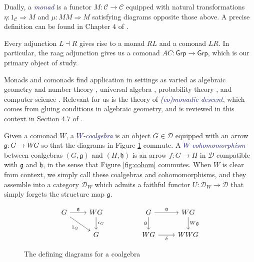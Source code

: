 \documentclass[12pt]{article}
\theoremstyle{definition}
\theoremstyle{theorem}
\newcommand*{\catFont}[1]{\mathsf{#1}}
\newcommand*{\catVarFont}[1]{\mathcal{#1}}
\newcommand{\Grp}{\catFont{Grp}}
\newcommand{\catC}{\catVarFont{C}}
\newcommand{\catD}{\catVarFont{D}}
\newcommand*{\important}[1]{\textcolor{MidnightBlue}{\emph{#1}}}
\begin{document}
Dually, a \important{monad} is a functor $M : \catC \to \catC$ equipped with 
natural transformations $\eta : 1_\catC \Rightarrow M$ and 
$\mu : MM \Rightarrow M$ satisfying diagrams opposite those above. A precise
definition can be found in Chapter $4$ of \cite{borceuxCategoriesStructures1994}.

Every adjunction $L \dashv R$ gives rise to a monad $RL$ and a comonad 
$LR$. In particular, the raag adjunction gives us a comonad 
$AC : \Grp \to \Grp$, which is our primary object of study.

Monads and comonads find application in settings as varied as algebraic 
geometry and number theory
\cite{grothendieckTechniqueDescenteTheoremes1958, 
borceuxCategoriesStructures1994,
borceuxMonadicApproachGalois2010},
universal algebra 
\cite{borceuxCategoriesStructures1994,
adamekAlgebraicTheoriesCategorical2011,
bojanczykRecognisableLanguagesMonads2015,
awodeyCoalgebraicDualBirkhoff2000,
hylandCategoryTheoreticUnderstanding2007},
probability theory 
\cite{giryCategoricalApproachProbability1982,
culbertsonCategoricalFoundationBayesian2014,
leinsterCODENSITYULTRAFILTERMONAD2013},
and computer science 
\cite{moggiNotionsComputationMonads1991,
depaivaDialecticaComonads2021,
ghaniAlgebrasCoalgebrasMonads2001,
ruttenUniversalCoalgebraTheory2000}.
Relevant for us is the theory of \important{(co)monadic descent}, 
which comes from gluing conditions in algebraic geometry, 
and is reviewed in this context in Section $4.7$ of 
\cite{borceuxCategoriesStructures1994}.

Given a comonad $W$, a \important{$W$-coalgebra} is an object
$G \in \catD$ equipped with an arrow $\mathfrak{g} : G \to WG$ so that the
diagrams in Figure \ref{fig:coalg} commute. A \important{$W$-cohomomorphism}
between coalgebras $(G,\mathfrak{g})$ and $(H,\mathfrak{h})$ is an arrow $f : G \to H$
in $\mathcal{D}$ compatible with $\mathfrak{g}$ and $\mathfrak{h}$, in the sense that 
Figure \ref{fig:cohom} commutes. When $W$ is clear from context, we simply call these
coalgebras and cohomomorphisms, and they assemble into a category $\catD_W$
which admits a faithful functor $U : \catD_W \to \catD$ that 
simply forgets the structure map $\mathfrak{g}$.

\begin{figure}
    \[
        \begin{tikzcd}
        G & WG && G & WG \\
        & G && WG & WWG
        \arrow["\mathfrak{g}", from=1-1, to=1-2]
        \arrow["{\epsilon_G}", from=1-2, to=2-2]
        \arrow["{1_G}"', from=1-1, to=2-2]
        \arrow["\mathfrak{g}"', from=1-4, to=2-4]
        \arrow["\mathfrak{g}", from=1-4, to=1-5]
        \arrow["\delta"', from=2-4, to=2-5]
        \arrow["W\mathfrak{g}", from=1-5, to=2-5]
        \end{tikzcd}
    \]
    \caption{The defining diagrams for a coalgebra}
    \label{fig:coalg}
\end{figure}
\end{document}
